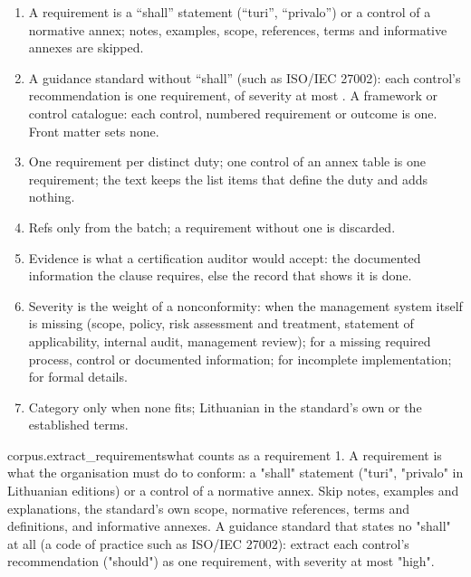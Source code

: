 \begin{enumerate}[itemsep=1pt, topsep=3pt]
  \item A requirement is a \enquote{shall} statement (\enquote{turi}, \enquote{privalo}) or a
    control of a normative annex; notes, examples, scope, references, terms and informative
    annexes are skipped.
  \item A guidance standard without \enquote{shall} (such as ISO/IEC 27002): each control's
    recommendation is one requirement, of severity at most . A framework or control
    catalogue: each control, numbered requirement or outcome is one. Front matter sets none.
  \item One requirement per distinct duty; one control of an annex table is one requirement;
    the text keeps the list items that define the duty and adds nothing.
  \item Refs only from the batch; a requirement without one is discarded.
  \item Evidence is what a certification auditor would accept: the documented information the
    clause requires, else the record that shows it is done.
  \item Severity is the weight of a nonconformity:  when the management system
    itself is missing (scope, policy, risk assessment and treatment, statement of
    applicability, internal audit, management review);  for a missing required
    process, control or documented information;  for incomplete implementation;
     for formal details.
  \item Category  only when none fits; Lithuanian in the standard's own or the
    established terms.
\end{enumerate}

\par\nopagebreak
\begin{promptexcerpt}{corpus.extract_requirements}{what counts as a requirement}
1. A requirement is what the organisation must do to conform: a "shall"
   statement ("turi", "privalo" in Lithuanian editions) or a control of a
   normative annex. Skip notes, examples and explanations, the standard's own
   scope, normative references, terms and definitions, and informative
   annexes. A guidance standard that states no "shall" at all (a code of
   practice such as ISO/IEC 27002): extract each control's recommendation
   ("should") as one requirement, with severity at most "high".
\end{promptexcerpt}

